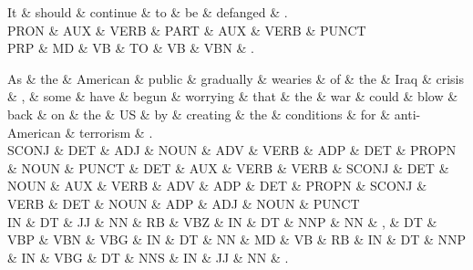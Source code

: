 \begin{dependency}
\begin{deptext}
It \& should \& continue \& to \& be \& defanged \& . \\
PRON \& AUX \& VERB \& PART \& AUX \& VERB \& PUNCT \\
PRP \& MD \& VB \& TO \& VB \& VBN \& . \\
\end{deptext}



\end{dependency}

\begin{dependency}
\begin{deptext}
As \& the \& American \& public \& gradually \& wearies \& of \& the \& Iraq \& crisis \& , \& some \& have \& begun \& worrying \& that \& the \& war \& could \& blow \& back \& on \& the \& US \& by \& creating \& the \& conditions \& for \& anti-American \& terrorism \& . \\
SCONJ \& DET \& ADJ \& NOUN \& ADV \& VERB \& ADP \& DET \& PROPN \& NOUN \& PUNCT \& DET \& AUX \& VERB \& VERB \& SCONJ \& DET \& NOUN \& AUX \& VERB \& ADV \& ADP \& DET \& PROPN \& SCONJ \& VERB \& DET \& NOUN \& ADP \& ADJ \& NOUN \& PUNCT \\
IN \& DT \& JJ \& NN \& RB \& VBZ \& IN \& DT \& NNP \& NN \& , \& DT \& VBP \& VBN \& VBG \& IN \& DT \& NN \& MD \& VB \& RB \& IN \& DT \& NNP \& IN \& VBG \& DT \& NNS \& IN \& JJ \& NN \& . \\
\end{deptext}



\end{dependency}

